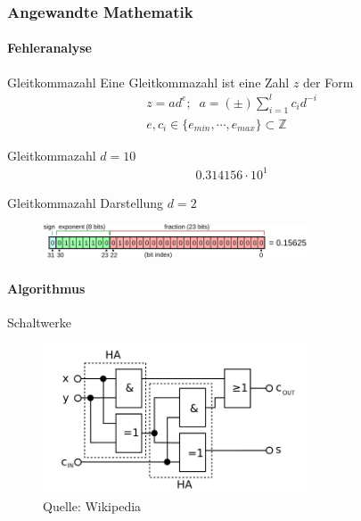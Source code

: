 \documentclass{beamer}
\begin{document}
\begin{frame}
    \frametitle{Angewandte Mathematik}
\framesubtitle{Fehleranalyse}
    \begin{block}{Gleitkommazahl}
Eine Gleitkommazahl ist eine Zahl $z$ der Form
\begin{align*}
z = a d^e ; \;\;
a = (\pm) \sum_{i=1}^l c_i d^{-i} \\
e, c_i \in \{e_{min}, \cdots , e_{max}  \} \subset \mathbb{Z}
\end{align*}
\end{block}

    \begin{block}{Gleitkommazahl $d=10$}
\begin{align*}
0.314156 \cdot 10^1
\end{align*}
\end{block}

\begin{block}{Gleitkommazahl Darstellung $d=2$}
\begin{figure}[H]
    \centering
  \includegraphics[width=0.7\textwidth]{images/float}\end{figure}
\end{block}

 \end{frame}

 \begin{frame}
    \framesubtitle{Algorithmus}
        \begin{block}{Schaltwerke}
    \begin{figure}[H]
          \centering
        \includegraphics[width=0.7\textwidth]{images/Volladdierer}
          \caption{Quelle: Wikipedia}
    \end{figure}
    \end{block}
    
     \end{frame}
    
\end{document}
